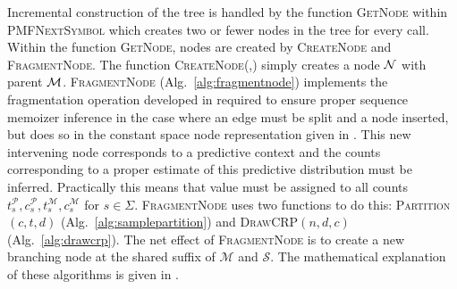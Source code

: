 Incremental construction of the tree is handled by the function \textsc{GetNode} within \textsc{PMFNextSymbol} which creates two or fewer nodes in the tree for every call.  Within the function \textsc{GetNode}, nodes are created by \textsc{CreateNode} and \textsc{FragmentNode}. The function \textsc{CreateNode(\N,\M)} simply creates a node $\N$ with parent $\M$. \textsc{FragmentNode} (Alg.~\ref{alg:fragmentnode}) implements the fragmentation operation developed in \citep{Wood2009} required to ensure proper sequence memoizer inference in the case where an edge must be split and a node inserted, but does so in the constant space node representation given in \citep{Gasthaus2011}.  This new intervening node corresponds to a predictive context and the counts corresponding to a proper estimate of this predictive distribution must be inferred.   Practically this means that value must be assigned to all counts $t_s^\mathcal{P}, c_s^\mathcal{P}, t_s^\mathcal{M}, c_s^\mathcal{M}$ for $s\in\Sigma$.  \textsc{FragmentNode} uses two functions to do this: \textsc{Partition}$(c,t,d)$ (Alg.~\ref{alg:samplepartition}) and \textsc{DrawCRP}$(n,d,c)$ (Alg.~\ref{alg:drawcrp}).  The net effect of \textsc{FragmentNode} is to create a new branching node at the shared suffix of $\mathcal{M}$ and $\mathcal{S}.$   The mathematical explanation of these algorithms is given in \citep{Gasthaus2011}.  %

